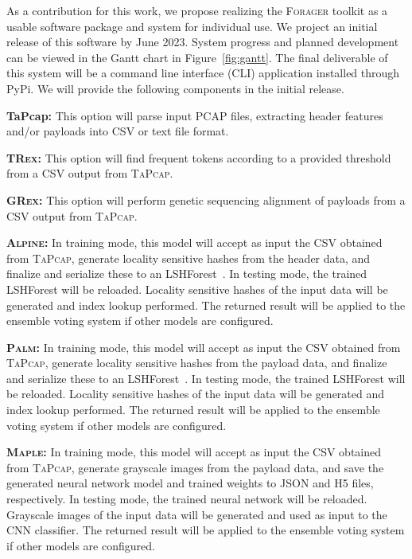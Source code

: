 As a contribution for this work, we propose realizing the \textsc{Forager} toolkit as a usable software package and system for individual use. We project an initial release of this software by June 2023. System progress and planned development can be viewed in the Gantt chart in Figure~\ref{fig:gantt}. The final deliverable of this system will be a command line interface (CLI) application installed through PyPi. We will provide the following components in the initial release.

\textbf{TaPcap: } This option will parse input PCAP files, extracting header features and/or payloads into CSV or text file format.

\textbf{\textsc{TRex}: } This option will find frequent tokens according to a provided threshold from a CSV output from \textsc{TaPcap}.

\textbf{\textsc{GRex}: } This option will perform genetic sequencing alignment of payloads from a CSV output from \textsc{TaPcap}.

\textbf{\textsc{Alpine}: } In training mode, this model will accept as input the CSV obtained from \textsc{TaPcap}, generate locality sensitive hashes from the header data, and finalize and serialize these to an LSHForest~\cite{lshforest}. In testing mode, the trained LSHForest will be reloaded. Locality sensitive hashes of the input data will be generated and index lookup performed. The returned result will be applied to the ensemble voting system if other models are configured.

\textbf{\textsc{Palm}: } In training mode, this model will accept as input the CSV obtained from \textsc{TaPcap}, generate locality sensitive hashes from the payload data, and finalize and serialize these to an LSHForest~\cite{lshforest}. In testing mode, the trained LSHForest will be reloaded. Locality sensitive hashes of the input data will be generated and index lookup performed. The returned result will be applied to the ensemble voting system if other models are configured.

\textbf{\textsc{Maple}: } In training mode, this model will accept as input the CSV obtained from \textsc{TaPcap}, generate grayscale images from the payload data, and save the generated neural network model and trained weights to JSON and H5 files, respectively. In testing mode, the trained neural network will be reloaded. Grayscale images of the input data will be generated and used as input to the CNN classifier. The returned result will be applied to the ensemble voting system if other models are configured.

